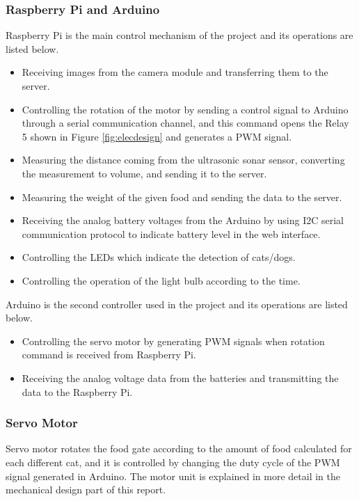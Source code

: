 \subsubsection{Raspberry Pi and Arduino} 
Raspberry Pi is the main control mechanism of the project and its operations are listed below.

\begin{itemize}
\item Receiving images from the camera module and transferring them to the server.
\item Controlling the rotation of the motor by sending a control signal to Arduino through a serial communication channel, and this command opens the Relay 5 shown in Figure \ref{fig:elecdesign} and generates a PWM signal.
\item Measuring the distance coming from the ultrasonic sonar sensor, converting the measurement to volume, and sending it to the server.
\item Measuring the weight of the given food and sending the data to the server.
\item Receiving the analog battery voltages from the Arduino by using I2C serial communication protocol to indicate battery level in the web interface.
\item Controlling the LEDs which indicate the detection of cats/dogs.
\item Controlling the operation of the light bulb according to the time.

\end{itemize}
Arduino is the second controller used in the project and its operations are listed below.
\begin{itemize}
\item  Controlling the servo motor by generating PWM signals when rotation command is received from Raspberry Pi.
\item Receiving the analog voltage data from the batteries and transmitting the data to the Raspberry Pi.
\end{itemize}

\subsubsection{Servo Motor} 
Servo motor rotates the food gate according to the amount of food calculated for each different cat, and it is controlled by changing the duty cycle of the PWM signal generated in Arduino. The motor unit is explained in more detail in the mechanical design part of this report. 

